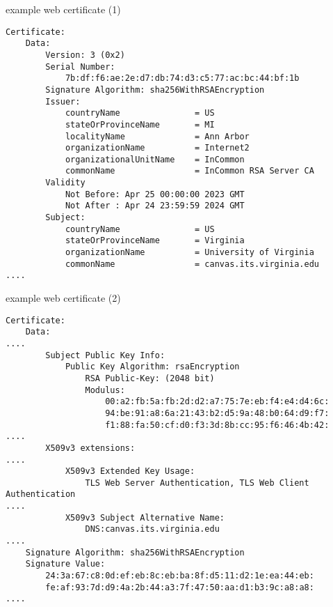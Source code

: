\begin{frame}[fragile]{example web certificate (1)}
\begin{Verbatim}[fontsize=\scriptsize]
Certificate:
    Data:
        Version: 3 (0x2)
        Serial Number:
            7b:df:f6:ae:2e:d7:db:74:d3:c5:77:ac:bc:44:bf:1b
        Signature Algorithm: sha256WithRSAEncryption
        Issuer:
            countryName               = US
            stateOrProvinceName       = MI
            localityName              = Ann Arbor
            organizationName          = Internet2
            organizationalUnitName    = InCommon
            commonName                = InCommon RSA Server CA
        Validity
            Not Before: Apr 25 00:00:00 2023 GMT
            Not After : Apr 24 23:59:59 2024 GMT
        Subject:
            countryName               = US
            stateOrProvinceName       = Virginia
            organizationName          = University of Virginia
            commonName                = canvas.its.virginia.edu
....
\end{Verbatim}
\end{frame}

\begin{frame}[fragile]{example web certificate (2)}
\begin{Verbatim}[fontsize=\scriptsize]
Certificate:
    Data:
....
        Subject Public Key Info:
            Public Key Algorithm: rsaEncryption
                RSA Public-Key: (2048 bit)
                Modulus:
                    00:a2:fb:5a:fb:2d:d2:a7:75:7e:eb:f4:e4:d4:6c:
                    94:be:91:a8:6a:21:43:b2:d5:9a:48:b0:64:d9:f7:
                    f1:88:fa:50:cf:d0:f3:3d:8b:cc:95:f6:46:4b:42:
....
        X509v3 extensions:
....
            X509v3 Extended Key Usage: 
                TLS Web Server Authentication, TLS Web Client Authentication
....
            X509v3 Subject Alternative Name: 
                DNS:canvas.its.virginia.edu
....
    Signature Algorithm: sha256WithRSAEncryption
    Signature Value:
        24:3a:67:c8:0d:ef:eb:8c:eb:ba:8f:d5:11:d2:1e:ea:44:eb:
        fe:af:93:7d:d9:4a:2b:44:a3:7f:47:50:aa:d1:b3:9c:a8:a8:
....
\end{Verbatim}
\end{frame}


